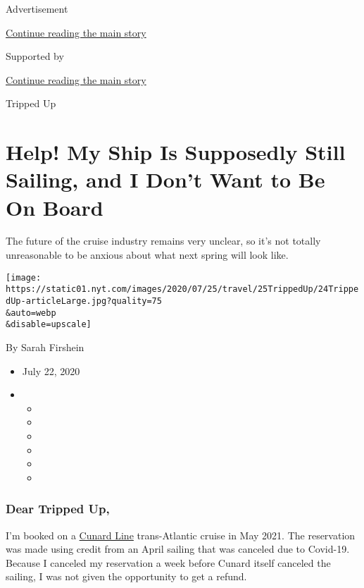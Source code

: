 Advertisement

\protect\hyperlink{after-top}{Continue reading the main story}

Supported by

\protect\hyperlink{after-sponsor}{Continue reading the main story}

Tripped Up

\hypertarget{help-my-ship-is-supposedly-still-sailing-and-i-dont-want-to-be-on-board}{%
\section{Help! My Ship Is Supposedly Still Sailing, and I Don't Want to
Be On
Board}\label{help-my-ship-is-supposedly-still-sailing-and-i-dont-want-to-be-on-board}}

The future of the cruise industry remains very unclear, so it's not
totally unreasonable to be anxious about what next spring will look
like.

\texttt{[image: https://static01.nyt.com/images/2020/07/25/travel/25TrippedUp/24TrippedUp-articleLarge.jpg?quality=75\\\&auto=webp\\\&disable=upscale]}

By Sarah Firshein

\begin{itemize}
\item
  July 22, 2020
\item
  \begin{itemize}
  \item
  \item
  \item
  \item
  \item
  \item
  \end{itemize}
\end{itemize}

\hypertarget{dear-tripped-up}{%
\subsubsection{\texorpdfstring{\textbf{Dear Tripped
Up,}}{Dear Tripped Up,}}\label{dear-tripped-up}}

I'm booked on a \href{https://www.cunard.com/en-us}{Cunard Line}
trans-Atlantic cruise in May 2021. The reservation was made using credit
from an April sailing that was canceled due to Covid-19. Because I
canceled my reservation a week before Cunard itself canceled the
sailing, I was not given the opportunity to get a refund.

